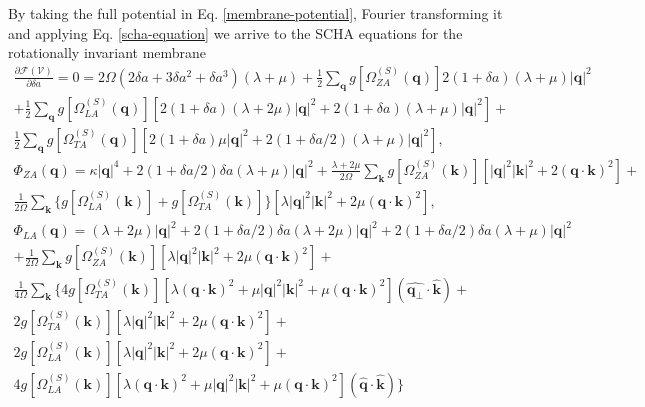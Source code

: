 By taking the full potential in Eq. \ref{membrane-potential}, Fourier transforming it and applying 
Eq. \ref{scha-equation} we arrive to the SCHA equations for the rotationally invariant membrane
\begin{multline}
 \frac{\partial\mathcal{F}(\mathcal{V})}{\partial\delta a}=0=2\Omega(2\delta a+3\delta a^{2}+\delta a^{3})(\lambda+
\mu)+\frac{1}{2}\sum_{\boldsymbol{q}}g[\Omega_{ZA}^{(S)}(\boldsymbol{q})]2(1+\delta a)(\lambda+\mu)|\boldsymbol{
 q}|^{2}\\+\frac{1}{2}\sum_{\boldsymbol{q}}g[\Omega_{LA}^{(S)}(\boldsymbol{q})][2(1+\delta a)(\lambda+2\mu)|\boldsymbol{q}|^{2}+2(1+\delta a)(\lambda+\mu)|\boldsymbol{q}|^{2}]+\\\frac{1}{2}\sum_{\boldsymbol{q}}g[\Omega_{
 TA}^{(S)}(\boldsymbol{q})][2(1+\delta a)\mu|\boldsymbol{q}|^{2}+2(1+\delta a/2)(\lambda+\mu)|\boldsymbol{q}|^{2}],
\end{multline}
\begin{multline}
 \Phi_{ZA}(\boldsymbol{q})=\kappa|\boldsymbol{q}|^{4}+2(1+\delta a/2)\delta a(\lambda+\mu)|\boldsymbol{q}|^{2}+\frac{\lambda+2\mu}{2\Omega}\sum_{\boldsymbol{k}}g[\Omega_{ZA}^{(S)}(\boldsymbol{k})][|\boldsymbol{q}|^{2}|\boldsymbol{
 k}|^{2}+2(\boldsymbol{q}\cdot\boldsymbol{k})^{2}]+\\\frac{1}{2\Omega}\sum_{\boldsymbol{k}}\{g[\Omega_{LA}^{(S)}(\boldsymbol{k})]+g[\Omega_{TA}^{(S)}(\boldsymbol{k})]\}[\lambda|\boldsymbol{q}|^{2}|\boldsymbol{k}|^{2}+2\mu(
 \boldsymbol{q}\cdot\boldsymbol{k})^{2}],
\end{multline}
\begin{multline}
 \Phi_{LA}(\boldsymbol{q})=(\lambda+2\mu)|\boldsymbol{q}|^{2}+2(1+\delta a/2)\delta a(\lambda+2\mu)|\boldsymbol{q}|^{2}+2(1+\delta a/2)\delta a(\lambda+\mu)|\boldsymbol{q}|^{2}\\+\frac{1}{2\Omega}\sum_{\boldsymbol{k}}g[\Omega_{ZA}^{
 (S)}(\boldsymbol{k})][\lambda|\boldsymbol{q}|^{2}|\boldsymbol{k}|^{2}+2\mu(\boldsymbol{q}\cdot\boldsymbol{k})^{2}]+\\\frac{1}{4\Omega}\sum_{\boldsymbol{k}}\{4g[\Omega_{TA}^{(S)}(\boldsymbol{k})][\lambda(\boldsymbol{q}\cdot\boldsymbol{
 k})^{2}+\mu|\boldsymbol{q}|^{2}|\boldsymbol{k}|^{2}+\mu(\boldsymbol{q}\cdot\boldsymbol{k})^{2}](\hat{\boldsymbol{q}_{\perp}}\cdot\hat{\boldsymbol{k}})+ \\ 2g[\Omega_{TA}^{(S)}(\boldsymbol{k})][\lambda|\boldsymbol{q}|^{2}|\boldsymbol{
 k}|^{2}+2\mu(\boldsymbol{q}\cdot\boldsymbol{k})^{2}]+ \\ 2g[\Omega_{LA}^{(S)}(\boldsymbol{k})][\lambda|\boldsymbol{q}|^{2}|\boldsymbol{k}|^{2}+2\mu(\boldsymbol{q}\cdot\boldsymbol{k})^{2}]+ \\ 4g[\Omega_{LA}^{(S)}(\boldsymbol{
 k})][\lambda(\boldsymbol{q}\cdot\boldsymbol{k})^{2}+\mu|\boldsymbol{q}|^{2}|\boldsymbol{k}|^{2}+\mu(\boldsymbol{q}\cdot\boldsymbol{k})^{2}](\hat{\boldsymbol{q}}\cdot\hat{\boldsymbol{k}})\}
\end{multline}
